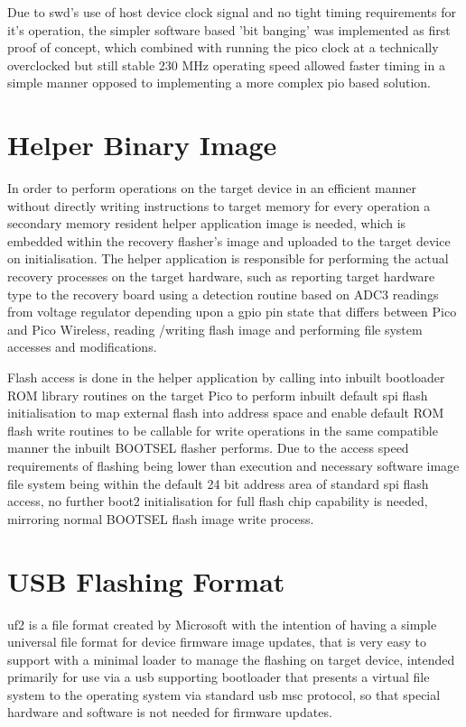 {Due to \gls{swd}'s use of host device clock signal and no tight timing requirements for it's operation, the simpler software based 'bit banging' was implemented as first proof of concept, which combined with running the pico clock at a technically overclocked but still stable 230 MHz operating speed allowed faster timing in a simple manner opposed to implementing a more complex pio based solution.


\clearpage
\section{Helper Binary Image}
In order to perform operations on the target device in an efficient manner without directly writing instructions to target memory for every operation a secondary memory resident helper application image is needed, which is embedded within the recovery flasher's image and uploaded to the target device on initialisation. The helper application is responsible for performing the actual recovery processes on the target hardware, such as reporting target hardware type to the recovery board using a detection routine based on ADC3 readings from voltage regulator depending upon a \gls{gpio} pin state that differs between Pico and Pico Wireless\cite{IdentifyingPicoPicoW}, reading /writing flash image and performing file system accesses and modifications.

Flash access is done in the helper application by calling into inbuilt bootloader ROM library routines on the target Pico to perform inbuilt default \gls{spi} flash initialisation to map external flash into address space and enable default ROM flash write routines to be callable for write operations in the same compatible manner the inbuilt BOOTSEL flasher performs. Due to the access speed requirements of flashing being lower than execution and necessary software image file system being within the default 24 bit address area of standard \gls{spi} flash access, no further boot2 initialisation for full flash chip capability is needed, mirroring normal BOOTSEL flash image write process.

\clearpage
\section{USB Flashing Format}
\gls{uf2} is a file format created by Microsoft with the intention of having a simple universal file format for device firmware image updates, that is very easy to support with a minimal loader to manage the flashing on target device, intended primarily for use via a \gls{usb} supporting bootloader that presents a virtual file system to the operating system via standard \gls{usb} \gls{msc} protocol, so that special hardware and software is not needed for firmware updates.

}
